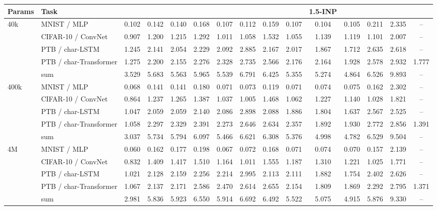 \begin{tabular}{l l ccccccccccccc}
\toprule
Params & Task & \BP{} & \SPSA{} & \SPSAb{} & \RS{} & \NP{} & \ANP{} & \ANPb{} & \INP{} & 1.5-INP & \DUST{} & \DANP{} & \FF{} & \IPC{} \\
\midrule
40k & MNIST / MLP & 0.102 & 0.142 & 0.140 & 0.168 & 0.107 & 0.112 & 0.159 & 0.107 & 0.104 & 0.105 & 0.211 & 2.335 & -- \\
 & CIFAR-10 / ConvNet & 0.907 & 1.200 & 1.215 & 1.292 & 1.011 & 1.058 & 1.532 & 1.055 & 1.139 & 1.119 & 1.101 & 2.007 & -- \\
 & PTB / char-LSTM & 1.245 & 2.141 & 2.054 & 2.229 & 2.092 & 2.885 & 2.167 & 2.017 & 1.867 & 1.712 & 2.635 & 2.618 & -- \\
 & PTB / char-Transformer & 1.275 & 2.200 & 2.155 & 2.276 & 2.328 & 2.735 & 2.566 & 2.176 & 2.164 & 1.928 & 2.578 & 2.932 & 1.777 \\
 & sum & 3.529 & 5.683 & 5.563 & 5.965 & 5.539 & 6.791 & 6.425 & 5.355 & 5.274 & 4.864 & 6.526 & 9.893 & -- \\
\midrule
400k & MNIST / MLP & 0.068 & 0.141 & 0.141 & 0.180 & 0.071 & 0.073 & 0.119 & 0.071 & 0.074 & 0.075 & 0.162 & 2.302 & -- \\
 & CIFAR-10 / ConvNet & 0.864 & 1.237 & 1.265 & 1.387 & 1.037 & 1.005 & 1.468 & 1.062 & 1.227 & 1.140 & 1.028 & 1.821 & -- \\
 & PTB / char-LSTM & 1.047 & 2.059 & 2.059 & 2.140 & 2.086 & 2.898 & 2.088 & 1.886 & 1.804 & 1.637 & 2.567 & 2.525 & -- \\
 & PTB / char-Transformer & 1.058 & 2.297 & 2.329 & 2.391 & 2.273 & 2.646 & 2.634 & 2.357 & 1.892 & 1.930 & 2.772 & 2.856 & 1.391 \\
 & sum & 3.037 & 5.734 & 5.794 & 6.097 & 5.466 & 6.621 & 6.308 & 5.376 & 4.998 & 4.782 & 6.529 & 9.504 & -- \\
\midrule
4M & MNIST / MLP & 0.060 & 0.162 & 0.177 & 0.198 & 0.067 & 0.072 & 0.168 & 0.071 & 0.074 & 0.070 & 0.157 & 2.139 & -- \\
 & CIFAR-10 / ConvNet & 0.832 & 1.409 & 1.417 & 1.510 & 1.164 & 1.011 & 1.555 & 1.187 & 1.310 & 1.221 & 1.025 & 1.771 & -- \\
 & PTB / char-LSTM & 1.021 & 2.128 & 2.159 & 2.256 & 2.214 & 2.995 & 2.113 & 2.111 & 1.882 & 1.754 & 2.402 & 2.626 & -- \\
 & PTB / char-Transformer & 1.067 & 2.137 & 2.171 & 2.586 & 2.470 & 2.614 & 2.655 & 2.154 & 1.809 & 1.869 & 2.292 & 2.795 & 1.371 \\
 & sum & 2.981 & 5.836 & 5.923 & 6.550 & 5.914 & 6.692 & 6.492 & 5.522 & 5.075 & 4.915 & 5.876 & 9.330 & -- \\
\bottomrule
\end{tabular}
